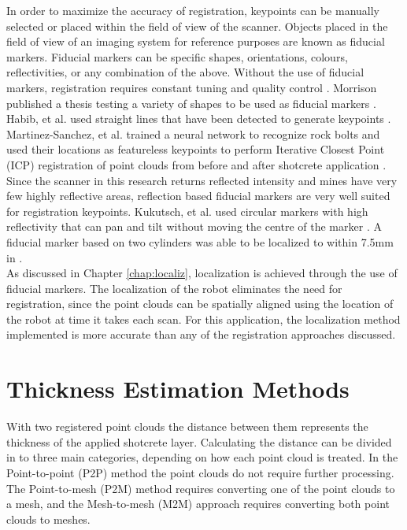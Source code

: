 In order to maximize the accuracy of registration, keypoints can be manually selected or placed within the field of view of the scanner. Objects placed in the field of view of an imaging system for reference purposes are known as fiducial markers. Fiducial markers can be specific shapes, orientations, colours, reflectivities, or any combination of the above. Without the use of fiducial markers, registration requires constant tuning and quality control \cite{reg3}. Morrison published a thesis testing a variety of shapes to be used as fiducial markers \cite{mark1}. Habib, et al. used straight lines that have been detected to generate keypoints \cite{key1}. Martinez-Sanchez, et al. trained a neural network to recognize rock bolts and used their locations as featureless keypoints to perform Iterative Closest Point (ICP) registration of point clouds from before and after shotcrete application \cite{reg2}.\\

Since the scanner in this research returns reflected intensity and mines have very few highly reflective areas, reflection based fiducial markers are very well suited for registration keypoints. Kukutsch, et al. used circular markers with high reflectivity that can pan and tilt without moving the centre of the marker \cite{mark2}. A fiducial marker based on two cylinders was able to be localized to within 7.5mm in \cite{mark3}.\\

As discussed in Chapter \ref{chap:localiz}, localization is achieved through the use of fiducial markers. The localization of the robot eliminates the need for registration, since the point clouds can be spatially aligned using the location of the robot at time it takes each scan. For this application, the localization method implemented is more accurate than any of the registration approaches discussed.\\

\section{Thickness Estimation Methods}

With two registered point clouds the distance between them represents the thickness of the applied shotcrete layer. Calculating the distance can be divided in to three main categories, depending on how each point cloud is treated. In the Point-to-point (P2P) method the point clouds do not require further processing. The Point-to-mesh (P2M) method requires converting one of the point clouds to a mesh, and the Mesh-to-mesh (M2M) approach requires converting both point clouds to meshes.\\

